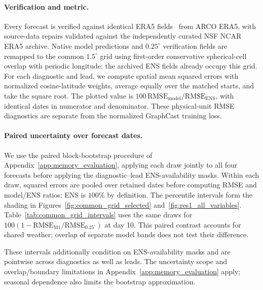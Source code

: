 \documentclass{article}
\newcommand{\vfourchange}[1]{{\color{blue}#1}}
\begin{document}
\paragraph{\vfourchange{Verification and metric.}}
\vfourchange{Every forecast is verified against identical ERA5 fields~\citep{hersbach2020era5} from ARCO ERA5, with source-data repairs validated against the independently curated NSF NCAR ERA5 archive. Native model predictions and $0.25^\circ$ verification fields are remapped to the common $1.5^\circ$ grid using first-order conservative spherical-cell overlap with periodic longitude; the archived ENS fields already occupy this grid. For each diagnostic and lead, we compute spatial mean squared errors with normalized cosine-latitude weights, average equally over the matched starts, and take the square root. The plotted value is $100\,\mathrm{RMSE}_{\mathrm{model}}/\mathrm{RMSE}_{\mathrm{ENS}}$, with identical dates in numerator and denominator. These physical-unit RMSE diagnostics are separate from the normalized GraphCast training loss.}

\paragraph{\vfourchange{Paired uncertainty over forecast dates.}}
\vfourchange{We use the paired block-bootstrap procedure of Appendix~\ref{app:memory_evaluation}, applying each draw jointly to all four forecasts before applying the diagnostic--lead ENS-availability masks. Within each draw, squared errors are pooled over retained dates before computing RMSE and model/ENS ratios; ENS is $100\%$ by definition. The percentile intervals form the shading in Figures~\ref{fig:common_grid_selected} and~\ref{fig:res1_all_variables}. Table~\ref{tab:common_grid_intervals} uses the same draws for $100(1-\mathrm{RMSE}_{\mathrm{M1}}/\mathrm{RMSE}_{0.25^\circ})$ at day 10. This paired contrast accounts for shared weather; overlap of separate model bands does not test their difference.}

\vfourchange{These intervals additionally condition on ENS-availability masks and are pointwise across diagnostics as well as leads. The uncertainty scope and overlap/boundary limitations in Appendix~\ref{app:memory_evaluation} apply; seasonal dependence also limits the bootstrap approximation.}
\end{document}
